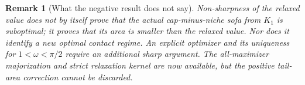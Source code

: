 \documentclass[11pt]{article}
\newtheorem{remark}[theorem]{Remark}
\begin{document}
\begin{remark}[What the negative result does not say]
Non-sharpness of the relaxed value does not by itself prove that the actual cap-minus-niche sofa from $K_1$ is suboptimal; it proves that its area is smaller than the relaxed value. Nor does it identify a new optimal contact regime. An explicit optimizer and its uniqueness for $1<\omega<\pi/2$ require an additional sharp argument. The all-maximizer majorization and strict relaxation kernel are now available, but the positive tail-area correction cannot be discarded.
\end{remark}
\end{document}
